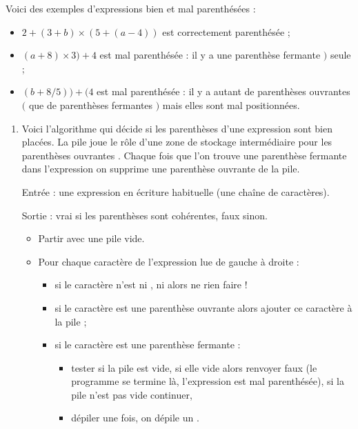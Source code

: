 \documentclass[11pt,class=report,crop=false]{standalone}
\begin{document}
\begin{activite}


Voici des exemples d'expressions bien et mal parenthésées :
\begin{itemize}
  \item $2 + (3 + b) \times (5 + (a - 4))$ est correctement parenthésée ;
  \item $(a+ 8) \times 3 ) + 4$ est mal parenthésée : il y a une parenthèse fermante \og{}$)$\fg{}  seule ;
  \item $(b + 8 / 5)) + (4$ est mal parenthésée : il y a autant de parenthèses ouvrantes 
  \og{}$($\fg{} que de parenthèses fermantes \og{}$)$\fg{} mais elles sont mal positionnées.
\end{itemize}

\begin{enumerate}
  \item 
 
  Voici l'algorithme qui décide si les parenthèses d'une expression sont bien placées. 
  La pile joue le rôle d'une zone de stockage intermédiaire pour les parenthèses ouvrantes . Chaque fois que l'on trouve une parenthèse fermante  dans l'expression on supprime une parenthèse ouvrante de la pile.
  
  \begin{algorithme}
  Entrée : une expression en écriture habituelle (une chaîne de caractères).
  
  Sortie : \og{}vrai\fg{} si les parenthèses sont cohérentes, \og{}faux\fg{} sinon. 
  
  \begin{itemize}
   \item Partir avec une pile vide.   
   
   \item Pour chaque caractère de l'expression lue de gauche à droite :
   \begin{itemize}
     \item si le caractère n'est ni , ni  alors ne rien faire !
     
     \item si le caractère est une parenthèse ouvrante   alors ajouter ce caractère à la pile ;
     
     \item si le caractère est une parenthèse fermante   :
       \begin{itemize}
         \item tester si la pile est vide, si elle vide alors renvoyer \og{}faux\fg{} (le programme se termine là, l'expression est mal parenthésée), si la pile n'est pas vide continuer, 
         \item dépiler une fois, on dépile un  .
       \end{itemize}
     \end{itemize} 
       

\end{itemize}
\end{algorithme}
\end{enumerate}
\end{activite}
\end{document}
